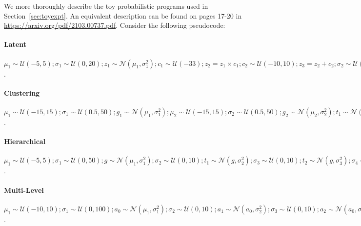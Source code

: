 We more thoroughly describe the toy probabilistic programs used in Section~\ref{sec:toyexpt}. An equivalent description can be found on pages 17-20 in \url{https://arxiv.org/pdf/2103.00737.pdf}. Consider the following pseudocode: 

\paragraph{Latent} $\mu_1 \sim \mathcal{U}(-5, 5); \sigma_1 \sim \mathcal{U}(0, 20); z_1 \sim \mathcal{N}(\mu_1, \sigma^2_1); c_1 \sim \mathcal{U}(-3 3); z_2 = z_1 \times c_1; c_2 \sim \mathcal{U}(-10, 10); z_3 = z_2 + c_2; \sigma_2 \sim \mathcal{U}(0.5, 10); z_4 \sim \mathcal{N}(z_3, \sigma^2_2)$.

\paragraph{Clustering} $\mu_1 \sim \mathcal{U}(-15, 15); \sigma_1 \sim \mathcal{U}(0.5, 50); g_1 \sim \mathcal{N}(\mu_1, \sigma^2_1); \mu_2 \sim \mathcal{U}(-15, 15); \sigma_2 \sim \mathcal{U}(0.5, 50); g_2 \sim \mathcal{N}(\mu_2, \sigma^2_2); t_1 \sim \mathcal{N}(0, 100); m_1 = \texttt{ if } (t_1 > 0) g_1 \texttt{ else } g_2; \sigma_3 \sim \mathcal{U}(0.5, 10); z_1 \sim \mathcal{N}(m_1, \sigma^2_3); t_2 \sim \mathcal{N}(0, 100); m_2 = \texttt{ if } (t_2 > 0) g_1 \texttt{ else } g_2; z_2 \sim \mathcal{N}(m_2, \sigma^2_3)$.

\paragraph{Hierarchical} $\mu_1 \sim \mathcal{U}(-5, 5); \sigma_1 \sim \mathcal{U}(0, 50); g \sim \mathcal{N}(\mu_1, \sigma^2_1); \sigma_2 \sim \mathcal{U}(0, 10); t_1 \sim \mathcal{N}(g, \sigma^2_2); \sigma_3 \sim \mathcal{U}(0, 10); t_2 \sim \mathcal{N}(g, \sigma^2_3); \sigma_4 \sim \mathcal{U}(0.5, 10); z_1 \sim \mathcal{N}(t_1, \sigma^2_4); \sigma_5 \sim \mathcal{U}(0.5, 10); z_2 \sim \mathcal{N}(t_2, \sigma^2_5)$.

\paragraph{Multi-Level} $\mu_1 \sim \mathcal{U}(-10, 10); \sigma_1 \sim \mathcal{U}(0, 100); a_0 \sim \mathcal{N}(\mu_1, \sigma^2_1); \sigma_2 \sim \mathcal{U}(0, 10); a_1 \sim \mathcal{N}(a_0, \sigma^2_2); \sigma_3 \sim \mathcal{U}(0, 10); a_2 \sim \mathcal{N}(a_0, \sigma^2_3); \mu_2 \sim \mathcal{U}(-5, 5); \sigma_4 \sim \mathcal{U}(0, 10); b \sim \mathcal{N}(\mu_2, \sigma^2_4); c_1 \sim \mathcal{U}(-5, 5); t_1 = b \times c_1; t_2 = a_1 + t_1; \sigma_5 \sim \mathcal{U}(0.5, 10); z_1 \sim \mathcal{N}(t_2, \sigma^2_5); c_2 \sim \mathcal{U}(-5, 5); t_3 = b \times c_2; t_4 = a_2 + t_3; \sigma_6 \sim \mathcal{U}(0.5, 10); z_2 \sim \mathcal{N}(t_4, \sigma^2_6)$.

